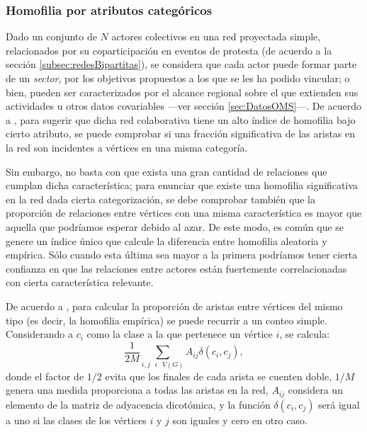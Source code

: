 \documentclass[letterpaper, 11pt]{book}
\theoremstyle{definition}
\theoremstyle{remark}
\begin{document}
\subsubsection{Homofilia por atributos categóricos}
\label{subsubsec:HomofiliaCategorica}

Dado un conjunto de $N$ actores colectivos en una red proyectada simple, relacionados por su coparticipación en eventos de protesta (de acuerdo a la sección \ref{subsec:redesBipartitas}), se considera que cada actor puede formar parte de un \emph{sector}, por los objetivos propuestos a los que se les ha podido vincular; o bien, pueden ser caracterizados por el alcance regional sobre el que extienden sus actividades u otros datos covariables ---ver sección \ref{sec:DatosOMS}---. 
De acuerdo a \citet{2010_Newman_Networks}, para sugerir que dicha red colaborativa tiene un alto índice de homofilia bajo cierto atributo, se puede comprobar si una fracción significativa de las aristas en la red son incidentes a vértices en una misma categoría. 

Sin embargo, no basta con que exista una gran cantidad de relaciones que cumplan dicha característica; para enunciar que existe una homofilia significativa en la red dada cierta categorización, se debe comprobar también que la proporción de relaciones entre vértices con una misma característica es mayor que aquella que podríamos esperar debido al azar. 
De este modo, es común que se genere un índice único que calcule la diferencia entre homofilia aleatoria y empírica. 
Sólo cuando esta última sea mayor a la primera podríamos tener cierta confianza en que las relaciones entre actores están fuertemente correlacionadas con cierta característica relevante.

De acuerdo a \citet{2010_Newman_Networks}, para calcular la proporción de aristas entre vértices del mismo tipo (es decir, la homofilia empírica) se puede recurrir a un conteo simple. 
Considerando a $c_{i}$ como la clase a la que pertenece un vértice $i$, se calcula: 
\begin{equation}\label{homofilia_empirica}
    \frac{1}{2M} \sum_{i, j \text{ } \epsilon \text{ } V(G)} A_{ij} \delta(c_{i},c_{j}),
\end{equation} 
donde el factor de $1/2$ evita que los finales de cada arista se cuenten doble, $1/M$ genera una medida proporciona a todas las aristas en la red, $A_{ij}$ considera un elemento de la matriz de adyacencia dicotómica, y la función $\delta(c_{i},c_{j})$ será igual a uno si las clases de los vértices $i$ y $j$ son iguales y cero en otro caso. 
\end{document}
